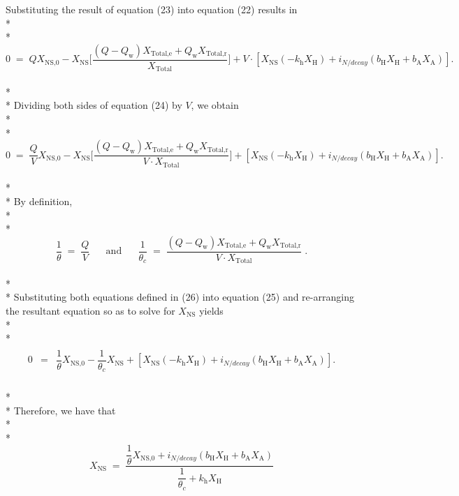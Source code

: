\documentclass[]{article}
\begin{document}
Substituting the result of equation (23) into equation (22) results in \\* \\* 
\begin{equation}
0 \; = \; QX_{\text{NS,0}} - X_{\text{NS}} \Bigg[\dfrac{(Q-Q_{\text{w}})X_{\text{Total,e}} + Q_{\text{w}}X_{\text{Total,r}}}{X_{\text{Total}}}\Bigg]  + V \cdot [X_{\text{NS}}(-k_{\text{h}}X_{\text{H}}) + i_{N/decay}(b_{\text{H}}X_{\text{H}}+b_{\text{A}}X_{\text{A}})].
\end{equation} \\* \\* 
Dividing both sides of equation (24) by $V$, we obtain \\* \\* 
\begin{equation}
0 \; = \; \dfrac{Q}{V}X_{\text{NS,0}} - X_{\text{NS}} \Bigg[\dfrac{(Q-Q_{\text{w}})X_{\text{Total,e}} + Q_{\text{w}}X_{\text{Total,r}}}{V \cdot X_{\text{Total}}}\Bigg]  + [X_{\text{NS}}(-k_{\text{h}}X_{\text{H}}) + i_{N/decay}(b_{\text{H}}X_{\text{H}}+b_{\text{A}}X_{\text{A}})].
\end{equation} \\* \\* 
By definition, \\* \\* 
\begin{equation}
\dfrac{1}{\theta} \; = \; \dfrac{Q}{V} \; \; \; \; \; \;  \text{and} \; \; \; \; \; \; \dfrac{1}{\theta_c} \; = \; \dfrac{(Q-Q_{\text{w}})X_{\text{Total,e}} + Q_{\text{w}}X_{\text{Total,r}}}{V \cdot X_{\text{Total}}} \; .
\end{equation} \\* \\* 
Substituting both equations defined in (26) into equation (25) and re-arranging the resultant equation so as to solve for $X_{\text{NS}}$ yields \\* \\* 
\begin{align}
\nonumber
\begin{array}{rcl}
0 &=& \dfrac{1}{\theta}X_{\text{NS,0}} - \dfrac{1}{\theta_c}X_{\text{NS}} + [X_{\text{NS}}(-k_{\text{h}}X_{\text{H}}) + i_{N/decay}(b_{\text{H}}X_{\text{H}}+b_{\text{A}}X_{\text{A}})].
\end{array}
\end{align}  \\* \\* 
Therefore, we have that \\* \\* 
\begin{equation}
\nonumber
\boxed{X_{\text{NS}} \; = \; \dfrac{\dfrac{1}{\theta}X_{\text{NS,0}} + i_{N/decay}(b_{\text{H}}X_{\text{H}}+b_{\text{A}}X_{\text{A}})}{\dfrac{1}{\theta_c} + k_{\text{h}}X_{\text{H}}}}
\end{equation}
\end{document}
